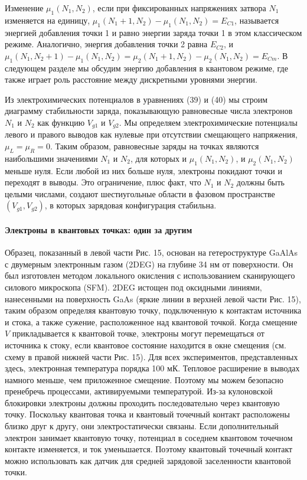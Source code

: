 \documentclass[a4paper,14pt]{extarticle}
\begin{document}
Изменение \(\mu_1(N_1, N_2)\), если при фиксированных напряжениях затвора \(N_1\) изменяется на единицу, \(\mu_1(N_1 + 1, N_2) - \mu_1(N_1, N_2) = E_{C1}\), называется энергией добавления точки 1 и равно энергии заряда точки 1 в этом классическом режиме. Аналогично, энергия добавления точки 2 равна \(E_{C2}\), и \(\mu_1(N_1, N_2 + 1) - \mu_1(N_1, N_2) = \mu_2(N_1 + 1, N_2) - \mu_2(N_1, N_2) = E_{Cm}\). В следующем разделе мы обсудим энергию добавления в квантовом режиме, где также играет роль расстояние между дискретными уровнями энергии.

Из электрохимических потенциалов в уравнениях (39) и (40) мы строим диаграмму стабильности заряда, показывающую равновесные числа электронов \(N_1\) и \(N_2\) как функцию \(V_{g1}\) и \(V_{g2}\). Мы определяем электрохимические потенциалы левого и правого выводов как нулевые при отсутствии смещающего напряжения, \(\mu_L = \mu_R = 0\). Таким образом, равновесные заряды на точках являются наибольшими значениями \(N_1\) и \(N_2\), для которых и \(\mu_1(N_1, N_2)\), и \(\mu_2(N_1, N_2)\) меньше нуля. Если любой из них больше нуля, электроны покидают точки и переходят в выводы. Это ограничение, плюс факт, что \(N_1\) и \(N_2\) должны быть целыми числами, создают шестиугольные области в фазовом пространстве \((V_{g1}, V_{g2})\), в которых зарядовая конфигурация стабильна.\cite{vander}

\paragraph{Электроны в квантовых точках: один за другим}

Образец, показанный в левой части Рис. 15, основан на гетероструктуре GaAlAs с двумерным электронным газом (2DEG) на глубине 34 нм от поверхности. Он был изготовлен методом локального окисления с использованием сканирующего силового микроскопа (SFM). 2DEG истощен под оксидными линиями, нанесенными на поверхность GaAs (яркие линии в верхней левой части Рис. 15), таким образом определяя квантовую точку, подключенную к контактам источника и стока, а также сужение, расположенное над квантовой точкой. Когда смещение \(V\) прикладывается к квантовой точке, электроны могут перемещаться от источника к стоку, если квантовое состояние находится в окне смещения (см. схему в правой нижней части Рис. 15). Для всех экспериментов, представленных здесь, электронная температура порядка 100 мК. Тепловое расширение в выводах намного меньше, чем приложенное смещение. Поэтому мы можем безопасно пренебречь процессами, активируемыми температурой. Из-за кулоновской блокировки электроны должны проходить последовательно через квантовую точку. Поскольку квантовая точка и квантовый точечный контакт расположены близко друг к другу, они электростатически связаны. Если дополнительный электрон занимает квантовую точку, потенциал в соседнем квантовом точечном контакте изменяется, и ток уменьшается. Поэтому квантовый точечный контакт можно использовать как датчик для средней зарядовой заселенности квантовой точки.
\end{document}
